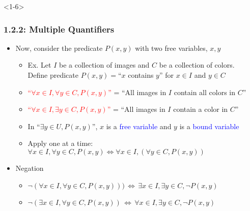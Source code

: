 \documentclass[10pt,english,aspectratio=169]{beamer}
\begin{document}
\begin{frame}<1-6> \frametitle{1.2.2: Multiple Quantifiers}



\begin{itemize}
\setlength\itemsep{6mm}
\item<1-> Now, consider the predicate $P(x,y)$ with two free variables, $x,y$ \vspace{1mm}
\begin{itemize}
 \setlength\itemsep{1.5mm}
 \item Ex. Let $I$ be a collection of images and $C$ be a collection of colors. \\ Define predicate $P(x,y)=$``$x$ contains $y$'' for $x\in I$ and $y\in C$ 
 \item<2-> \textcolor{red}{``$\forall x\!\in\! I, \forall y\!\in\! C, P(x,y)$''} = ``All images in $I$ contain all colors in $C$''
 \item<3-> \textcolor{red}{``$\forall x\!\in\! I, \exists y \!\in\! C, P(x,y)$''} = ``All images in $I$ contain a color in $C$''
 \item<4-> In ``$\exists y \in U, P(x,y)$'', $x$ is a \textcolor{blue}{free variable} and $y$ is a \textcolor{blue}{bound variable}
 \item<5-> Apply one at a time: $\forall x\!\in\! I, \forall y\!\in\! C, P(x,y) \Leftrightarrow \forall x\!\in\! I, \left(\forall y\!\in\! C, P(x,y)\right)$
\end{itemize}

\item<6-> Negation \vspace{1mm}
\begin{itemize}
 \setlength\itemsep{1.5mm}
 \item $\neg (\forall x\!\in\! I, \forall y\!\in\! C, P(x,y))) \,\Leftrightarrow\, \exists x\!\in\! I, \exists y\!\in\! C, \neg P(x,y)$
 \item $\neg (\exists x\!\in\! I, \forall y\!\in\! C, P(x,y)) \,\Leftrightarrow\, \forall x\!\in\! I, \exists y\!\in\! C, \neg P(x,y)$
\end{itemize}  

\end{itemize}



\end{frame}
\end{document}
